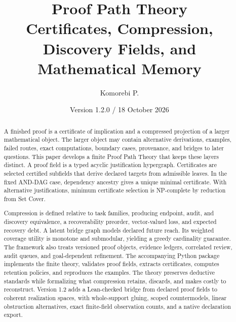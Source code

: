 \documentclass[11pt,oneside]{article}
\title{\textbf{Proof Path Theory}\\
\large Certificates, Compression, Discovery Fields, and Mathematical Memory}
\author{Komorebi P.}
\date{Version 1.2.0 / 18 October 2026}
\theoremstyle{definition}
\theoremstyle{remark}
\begin{document}
\maketitle

\begin{abstract}
A finished proof is a certificate of implication and a compressed projection of a larger mathematical object. The larger object may contain alternative derivations, examples, failed routes, exact computations, boundary cases, provenance, and bridges to later questions. This paper develops a finite Proof Path Theory that keeps these layers distinct. A proof field is a typed acyclic justification hypergraph. Certificates are selected certified subfields that derive declared targets from admissible leaves. In the fixed AND-DAG case, dependency ancestry gives a unique minimal certificate. With alternative justifications, minimum certificate selection is NP-complete by reduction from Set Cover.

Compression is defined relative to task families, producing endpoint, audit, and discovery equivalence, a recoverability preorder, vector-valued loss, and expected recovery debt. A latent bridge graph models declared future reach. Its weighted coverage utility is monotone and submodular, yielding a greedy cardinality guarantee. The framework also treats versioned proof objects, evidence ledgers, correlated review, audit queues, and goal-dependent refinement. The accompanying Python package implements the finite theory, validates proof fields, extracts certificates, computes retention policies, and reproduces the examples. The theory preserves deductive standards while formalizing what compression retains, discards, and makes costly to reconstruct. Version 1.2 adds a Lean-checked bridge from declared proof fields to coherent realization spaces, with whole-support gluing, scoped countermodels, linear obstruction alternatives, exact finite-field observation counts, and a native declaration export.
\end{abstract}

\begin{center}
\end{center}
\end{document}
